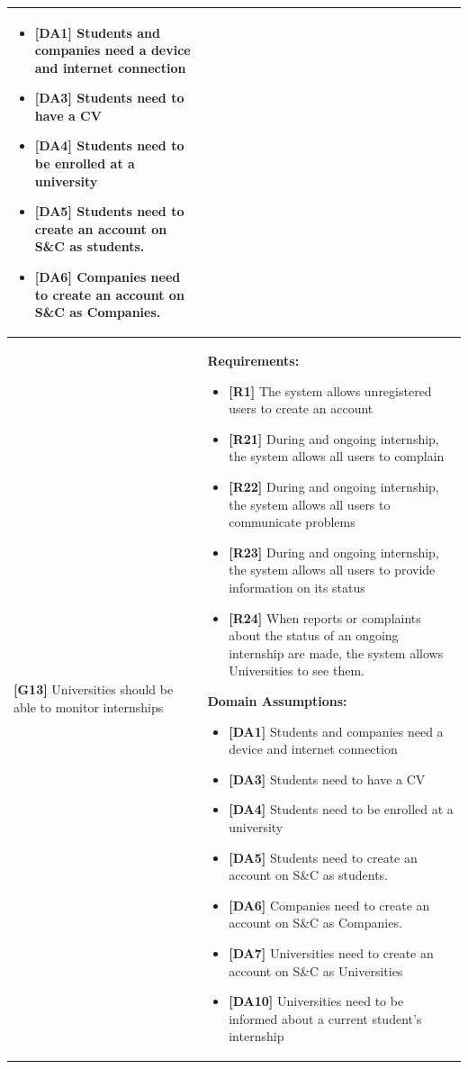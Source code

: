 \begin{longtable}{|p{}|p{}|}
\begin{itemize}
    \item \textbf{[DA1]} Students and companies need a device and internet connection
     \item \textbf{[DA3]} Students need to have a CV
     \item \textbf{[DA4]} Students need to be enrolled at a university
    \item \textbf{[DA5]} Students need to create an account on S\&C as students.
    \item \textbf{[DA6]} Companies need to create an account on S\&C as Companies.
\end{itemize} \\
\hline
\textbf{[G13]} Universities should be able to monitor internships
& 
\textbf{Requirements:}
\begin{itemize}
    \item \textbf{[R1]} The system allows unregistered users to create an account
    \item \textbf{[R21]} During and ongoing internship, the system allows all users to complain
    \item \textbf{[R22]} During and ongoing internship, the system allows all users to communicate problems
    \item \textbf{[R23]} During and ongoing internship, the system allows all users to provide information on its status
    \item \textbf{[R24]} When reports or complaints about the status of an ongoing internship are made, the system allows Universities to see them.
\end{itemize}
\textbf{Domain Assumptions:}
\begin{itemize}
    \item \textbf{[DA1]} Students and companies need a device and internet connection
     \item \textbf{[DA3]} Students need to have a CV
     \item \textbf{[DA4]} Students need to be enrolled at a university
    \item \textbf{[DA5]} Students need to create an account on S\&C as students.
    \item \textbf{[DA6]} Companies need to create an account on S\&C as Companies.
    \item \textbf{[DA7]} Universities need to create an account on S\&C as Universities
    \item \textbf{[DA10]} Universities need to be informed about a current student’s internship

\end{itemize}
\end{longtable}
